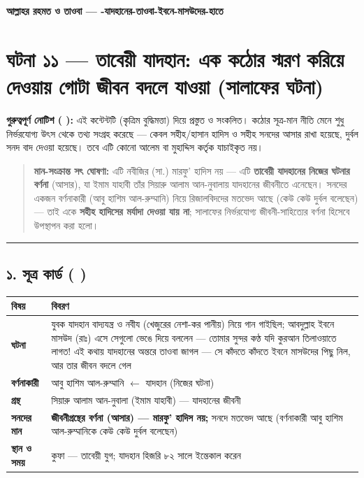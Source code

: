 

\begin{center}{\Large\bfseries\color{emerald} আল্লাহর রহমত ও তাওবা — -যাদহানের-তাওবা-ইবনে-মাসউদের-হাতে}\end{center}
\vspace{1em}
\section*{ঘটনা ১১ — তাবেয়ী যাদহান: এক কঠোর স্মরণ করিয়ে দেওয়ায় গোটা জীবন বদলে যাওয়া (সালাফের ঘটনা)}

\begin{warnbox}
 \textbf{গুরুত্বপূর্ণ নোটিশ ( ):} এই কন্টেন্টটি  (কৃত্রিম বুদ্ধিমত্তা) দিয়ে প্রস্তুত ও সংকলিত।  কঠোর সূত্র-মান নীতি মেনে শুধু নির্ভরযোগ্য উৎস থেকে তথ্য সংগ্রহ করেছে — কেবল সহীহ/হাসান হাদিস ও সহীহ সনদের আসার রাখা হয়েছে, দুর্বল সনদ বাদ দেওয়া হয়েছে। তবে এটি কোনো আলেম বা মুহাদ্দিস কর্তৃক যাচাইকৃত নয়।
\end{warnbox}

\begin{quote}
\textbf{মান-সংক্রান্ত সৎ ঘোষণা:} এটি নবীজির (সা.) মারফু' হাদিস নয় — এটি \textbf{তাবেয়ী যাদহানের নিজের ঘটনার বর্ণনা} (আসার), যা ইমাম যাহাবী তাঁর সিয়ারু আলাম আন-নুবালায় যাদহানের জীবনীতে এনেছেন। সনদের একজন বর্ণনাকারী (আবু হাশিম আল-রুম্মানি) নিয়ে রিজালবিদদের মতভেদ আছে (কেউ কেউ দুর্বল বলেছেন) — তাই একে \textbf{সহীহ হাদিসের মর্যাদা দেওয়া যায় না}; সালাফের নির্ভরযোগ্য জীবনী-সাহিত্যের বর্ণনা হিসেবে উপস্থাপন করা হলো।
\end{quote}

\medskip\hrule\medskip

\subsection*{১. সূত্র কার্ড ( )}

\begin{table}[h]\centering\small
\begin{tabular}{ll}
বিষয় & বিবরণ \\
\hline
\textbf{ঘটনা} & যুবক যাদহান বাদ্যযন্ত্র ও নবীয (খেজুরের নেশা-কর পানীয়) নিয়ে গান গাইছিল; আবদুল্লাহ ইবনে মাসউদ (রাঃ) এসে সেগুলো ভেঙে দিয়ে বললেন — তোমার সুন্দর কণ্ঠ যদি কুরআন তিলাওয়াতে লাগত! এই কথায় যাদহানের অন্তরে তাওবা জাগল — সে কাঁদতে কাঁদতে ইবনে মাসউদের পিছু নিল, আর তার জীবন বদলে গেল \\
\textbf{বর্ণনাকারী} & আবু হাশিম আল-রুম্মানি $\leftarrow$ যাদহান (নিজের ঘটনা) \\
\textbf{গ্রন্থ} & সিয়ারু আলাম আন-নুবালা (ইমাম যাহাবী) — যাদহানের জীবনী \\
\textbf{সনদের মান} & \textbf{জীবনীগ্রন্থের বর্ণনা (আসার) — মারফু' হাদিস নয়;} সনদে মতভেদ আছে (বর্ণনাকারী আবু হাশিম আল-রুম্মানিকে কেউ কেউ দুর্বল বলেছেন) \\
\textbf{স্থান ও সময়} & কুফা — তাবেয়ী যুগ; যাদহান হিজরি ৮২ সালে ইন্তেকাল করেন \\
\hline
\end{tabular}
\end{table}

